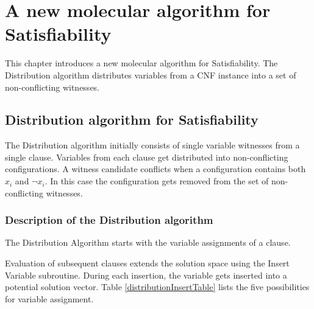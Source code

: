 
\chapter{A new molecular algorithm for {\sc Satisfiability}}

This chapter introduces a new molecular algorithm for {\sc Satisfiability}.  The Distribution algorithm distributes variables from a CNF instance into a set of non-conflicting witnesses.

\section{Distribution algorithm for {\sc Satisfiability}}


The Distribution algorithm initially consists of single variable witnesses from a single clause.  Variables from each clause get distributed into non-conflicting configurations.  A witness candidate conflicts when a configuration contains both $x_i$ and $\neg x_i$.  In this case the configuration gets removed from the set of non-conflicting witnesses.  



	\subsection{Description of the Distribution algorithm}
		

The {\sc Distribution Algorithm} starts with the variable assignments of a clause.



		
Evaluation of subsequent clauses extends the solution space using the {\sc Insert Variable} subroutine.  During each insertion, the variable gets inserted into a potential solution vector.  Table \ref{distributionInsertTable} lists the five possibilities for variable assignment.

